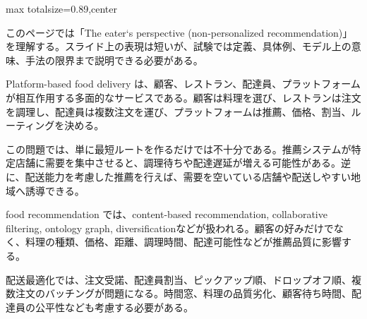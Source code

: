 \begin{minipage}[t]{0.58\textwidth}
\begin{adjustbox}{max totalsize={\textwidth}{0.89\textheight},center}
\begin{minipage}{\textwidth}\scriptsize
{}このページでは「The eater‘s perspective (non-personalized recommendation)」を理解する。スライド上の表現は短いが、試験では定義、具体例、モデル上の意味、手法の限界まで説明できる必要がある。\par
Platform-based food delivery は、顧客、レストラン、配達員、プラットフォームが相互作用する多面的なサービスである。顧客は料理を選び、レストランは注文を調理し、配達員は複数注文を運び、プラットフォームは推薦、価格、割当、ルーティングを決める。\par
この問題では、単に最短ルートを作るだけでは不十分である。推薦システムが特定店舗に需要を集中させると、調理待ちや配達遅延が増える可能性がある。逆に、配送能力を考慮した推薦を行えば、需要を空いている店舗や配送しやすい地域へ誘導できる。\par
food recommendation では、content-based recommendation, collaborative filtering, ontology graph, diversificationなどが扱われる。顧客の好みだけでなく、料理の種類、価格、距離、調理時間、配達可能性などが推薦品質に影響する。\par
配送最適化では、注文受諾、配達員割当、ピックアップ順、ドロップオフ順、複数注文のバッチングが問題になる。時間窓、料理の品質劣化、顧客待ち時間、配達員の公平性なども考慮する必要がある。\par

\end{minipage}
\end{adjustbox}
\end{minipage}
